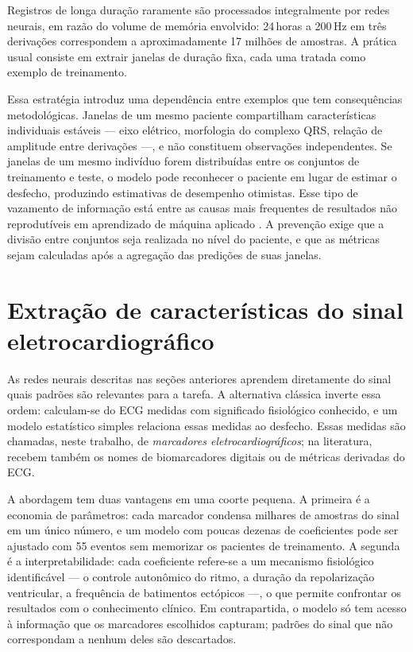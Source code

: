 Registros de longa duração raramente são processados integralmente por redes
neurais, em razão do volume de memória envolvido: 24\,horas a 200\,Hz em três
derivações correspondem a aproximadamente 17 milhões de amostras. A prática
usual consiste em extrair janelas de duração fixa, cada uma tratada como
exemplo de treinamento.

Essa estratégia introduz uma dependência entre exemplos que tem consequências
metodológicas. Janelas de um mesmo paciente compartilham características
individuais estáveis --- eixo elétrico, morfologia do complexo QRS, relação de
amplitude entre derivações ---, e não constituem observações independentes.
Se janelas de um mesmo indivíduo forem distribuídas entre os conjuntos de
treinamento e teste, o modelo pode reconhecer o paciente em lugar de estimar
o desfecho, produzindo estimativas de desempenho otimistas. Esse tipo de
vazamento de informação está entre as causas mais frequentes de resultados
não reprodutíveis em aprendizado de máquina aplicado
\cite{kapoor2023leakage}. A prevenção exige que a divisão entre conjuntos seja
realizada no nível do paciente, e que as métricas sejam calculadas após a
agregação das predições de suas janelas.


\section{Extração de características do sinal eletrocardiográfico}
\label{sec:fund-marcadores}

As redes neurais descritas nas seções anteriores aprendem diretamente do
sinal quais padrões são relevantes para a tarefa. A alternativa clássica
inverte essa ordem: calculam-se do \gls{ECG} medidas com significado
fisiológico conhecido, e um modelo estatístico simples relaciona essas
medidas ao desfecho. Essas medidas são chamadas, neste trabalho, de
\textit{marcadores eletrocardiográficos}; na literatura, recebem também os
nomes de biomarcadores digitais ou de métricas derivadas do \gls{ECG}.

A abordagem tem duas vantagens em uma coorte pequena. A primeira é a
economia de parâmetros: cada marcador condensa milhares de amostras do sinal
em um único número, e um modelo com poucas dezenas de coeficientes pode ser
ajustado com 55 eventos sem memorizar os pacientes de treinamento. A segunda
é a interpretabilidade: cada coeficiente refere-se a um mecanismo
fisiológico identificável --- o controle autonômico do ritmo, a duração da
repolarização ventricular, a frequência de batimentos ectópicos ---, o que
permite confrontar os resultados com o conhecimento clínico. Em
contrapartida, o modelo só tem acesso à informação que os marcadores
escolhidos capturam; padrões do sinal que não correspondam a nenhum deles
são descartados.

